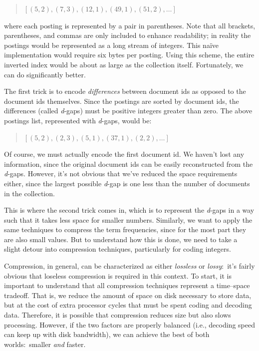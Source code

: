 \begin{quote}
$[ (5, 2), (7, 3), (12, 1), (49, 1), (51, 2), \ldots]$
\end{quote}

\noindent where each posting is represented by a pair in parentheses.
Note that all brackets, parentheses, and commas are only included to
enhance readability; in reality the postings would be represented as a
long stream of integers.  This na\"ive implementation would require
six bytes per posting.  Using this scheme, the entire inverted index
would be about as large as the collection itself.  Fortunately, we can
do significantly better.

The first trick is to encode \emph{differences} between document ids as
opposed to the document ids themselves.  Since the postings are sorted
by document ids, the differences (called \emph{d}-gaps) must be
positive integers greater than zero.  The above postings list,
represented with \emph{d}-gaps, would be:

\begin{quote}
$[ (5, 2), (2, 3), (5, 1), (37, 1), (2, 2), \ldots]$
\end{quote}

\noindent Of course, we must actually encode the first document id.
We haven't lost any information, since the original document ids can
be easily reconstructed from the \emph{d}-gaps.  However, it's not
obvious that we've reduced the space requirements either, since the
largest possible \emph{d}-gap is one less than the number of documents
in the collection.

This is where the second trick comes in, which is to represent the
\emph{d}-gaps in a way such that it takes less space for smaller
numbers.  Similarly, we want to apply the same techniques to compress
the term frequencies, since for the most part they are also small
values.  But to understand how this is done, we need to take a slight
detour into compression techniques, particularly for coding integers.

Compression, in general, can be characterized as either \emph{lossless}
or \emph{lossy}:\ it's fairly obvious that loseless compression is
required in this context.  To start, it is important to understand
that all compression techniques represent a time--space tradeoff.
That is, we reduce the amount of space on disk necessary to store
data, but at the cost of extra processor cycles that must be spent
coding and decoding data.  Therefore, it is possible that compression
reduces size but also slows processing.  However, if the two factors
are properly balanced (i.e., decoding speed can keep up with disk
bandwidth), we can achieve the best of both worlds:\ smaller \emph{and}
faster.

